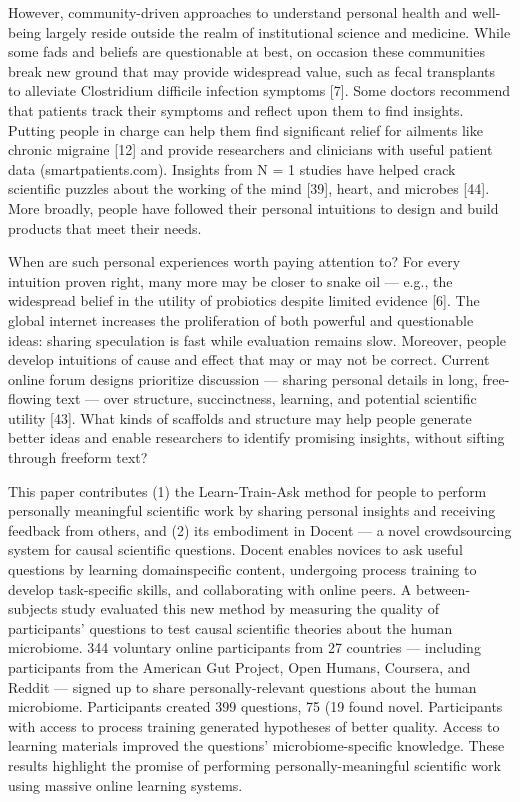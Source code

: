 However, community-driven approaches to understand personal
health and well-being largely reside outside the realm
of institutional science and medicine. While some fads and
beliefs are questionable at best, on occasion these communities
break new ground that may provide widespread value,
such as fecal transplants to alleviate Clostridium difficile infection
symptoms [7]. Some doctors recommend that patients
track their symptoms and reflect upon them to find
insights. Putting people in charge can help them find significant
relief for ailments like chronic migraine [12] and provide
researchers and clinicians with useful patient data
(smartpatients.com). Insights from N = 1 studies have helped
crack scientific puzzles about the working of the mind [39],
heart, and microbes [44]. More broadly, people have
followed their personal intuitions to design and build
products that meet their needs.

When are such personal experiences worth paying attention
to? For every intuition proven right, many more may be
closer to snake oil — e.g., the widespread belief in the utility
of probiotics despite limited evidence [6]. The global internet
increases the proliferation of both powerful and questionable
ideas: sharing speculation is fast while evaluation remains
slow. Moreover, people develop intuitions of cause and effect
that may or may not be correct. Current online forum
designs prioritize discussion — sharing personal details in
long, free-flowing text — over structure, succinctness, learning,
and potential scientific utility [43]. What kinds of scaffolds
and structure may help people generate better ideas and
enable researchers to identify promising insights, without
sifting through freeform text?

This paper contributes (1) the Learn-Train-Ask method for
people to perform personally meaningful scientific work by
sharing personal insights and receiving feedback from
others, and (2) its embodiment in Docent — a novel
crowdsourcing system for causal scientific questions. Docent
enables novices to ask useful questions by learning domainspecific
content, undergoing process training to develop
task-specific skills, and collaborating with online peers. A
between-subjects study evaluated this new method by measuring
the quality of participants’ questions to test causal scientific
theories about the human microbiome. 344 voluntary
online participants from 27 countries — including participants
from the American Gut Project, Open Humans,
Coursera, and Reddit — signed up to share personally-relevant
questions about the human microbiome. Participants
created 399 questions, 75 (19%
found novel. Participants with access to process training
generated hypotheses of better quality. Access to
learning materials improved the questions’ microbiome-specific
knowledge. These results highlight the promise of performing
personally-meaningful scientific work using
massive online learning systems.

